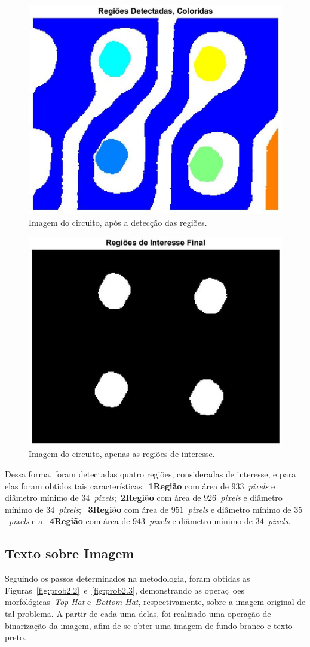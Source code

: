 \documentclass[conference]{Trabalho_2}
\begin{document}
\begin{figure}[!t]
  \centering
  \includegraphics[width = 4.5 cm]{Regi_es_Detectadas_Coloridas_}
  \caption{Imagem do circuito, ap\'os a detec\c{c}\~ao das regi\~oes.}
  \label{fig:prob1.3}
\end{figure}

\begin{figure}[!t]
  \centering
  \includegraphics[width = 4.5 cm]{Regi_es_de_Interesse_Final_}
  \caption{Imagem do circuito, apenas as regi\~oes de interesse.}
  \label{fig:prob1.4}
\end{figure}

Dessa forma, foram detectadas quatro regi\~oes, consideradas de interesse, e para elas foram obtidos tais caracter\'isticas:~\textbf{1\textdegree Regi\~ao} com \'area de $933$~\textit{pixels} e di\^ametro m\'inimo de $34$~\textit{pixels};~\textbf{2\textdegree Regi\~ao} com \'area de $926$~\textit{pixels} e di\^ametro m\'inimo de $34$~\textit{pixels}; ~\textbf{3\textdegree Regi\~ao} com \'area de $951$~\textit{pixels} e di\^ametro m\'inimo de $35$~\textit{pixels} e a ~\textbf{4\textdegree Regi\~ao} com \'area de $943$~\textit{pixels} e di\^ametro m\'inimo de $34$~\textit{pixels}.



\subsection{Texto sobre Imagem}
Seguindo os passos determinados na metodologia, foram obtidas as Figuras~\ref{fig:prob2.2}~e~\ref{fig:prob2.3}, demonstrando as opera\c{c}~oes morfol\'ogicas~\textit{Top-Hat} e~\textit{Bottom-Hat}, respectivamente, sobre a imagem original de tal problema. A partir de cada uma delas, foi realizado uma opera\c{c}\~ao de binariza\c{c}\~ao da imagem, afim de se obter uma imagem de fundo branco e texto preto.
\end{document}
